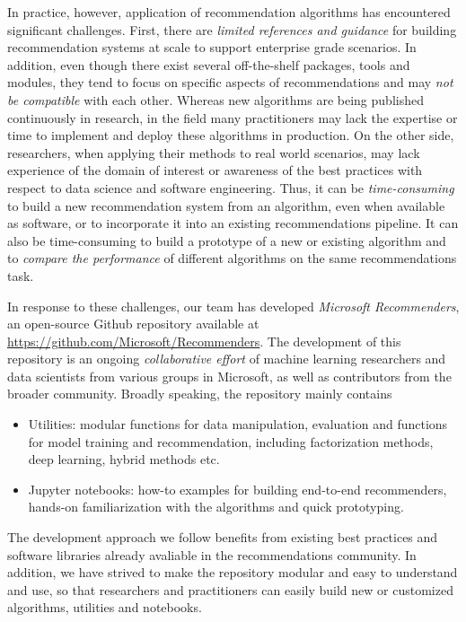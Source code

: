 In practice, however, application of recommendation algorithms has encountered significant challenges. 
First, there are {\em limited references and guidance} for building recommendation systems at scale to support
enterprise grade scenarios. In addition, even though there exist several off-the-shelf packages, tools and 
modules, they tend to focus on specific aspects of recommendations 
and may {\em not be compatible} with each other. Whereas new algorithms are being published continuously in research, in the field many practitioners may lack the 
expertise or time to implement and deploy these algorithms in production. 
On the other side, researchers, when applying their methods to real world scenarios, may lack experience of the domain of interest
or awareness of the best practices with respect to data science and software engineering. Thus, it can be {\em time-consuming} to build a new recommendation system from an
algorithm, even when available as software, or to incorporate it into an existing recommendations pipeline. It can also be time-consuming to build a prototype of a new or existing algorithm and to 
{\em compare the performance} of different algorithms on the same recommendations task. 

In response to these challenges, our team has developed {\em Microsoft Recommenders}, an open-source 
Github repository available at \url{https://github.com/Microsoft/Recommenders}.
The development of this repository is an ongoing {\em collaborative effort} of machine learning researchers and data scientists from 
various groups in Microsoft, as well as contributors from the broader community.
Broadly speaking, the repository mainly contains 
\begin{itemize}
\item
Utilities: modular functions for data manipulation, evaluation and functions for model training and recommendation, including 
factorization methods, deep learning, hybrid methods etc.
\item
Jupyter notebooks: how-to examples for building end-to-end recommenders, hands-on familiarization with the algorithms and quick prototyping. 
\end{itemize}
The development approach we follow benefits from existing best practices and software libraries already avaliable in the recommendations community.
In addition, we have strived to make the repository modular and easy to understand and use, so that researchers and practitioners can easily build
new or customized algorithms, utilities and notebooks.

